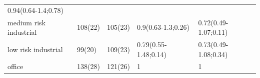 \begin{longtable}[]{@{}lllll@{}}
\begin{minipage}[t]{0.23\columnwidth}
0.94(0.64-1.4;0.78)\strut
\end{minipage}\tabularnewline
\begin{minipage}[t]{0.20\columnwidth}\raggedright
medium risk industrial\strut
\end{minipage} & \begin{minipage}[t]{0.08\columnwidth}\raggedright
108(22)\strut
\end{minipage} & \begin{minipage}[t]{0.10\columnwidth}\raggedright
105(23)\strut
\end{minipage} & \begin{minipage}[t]{0.24\columnwidth}\raggedright
0.9(0.63-1.3;0.26)\strut
\end{minipage} & \begin{minipage}[t]{0.23\columnwidth}\raggedright
0.72(0.49-1.07;0.11)\strut
\end{minipage}\tabularnewline
\begin{minipage}[t]{0.20\columnwidth}\raggedright
low risk industrial\strut
\end{minipage} & \begin{minipage}[t]{0.08\columnwidth}\raggedright
99(20)\strut
\end{minipage} & \begin{minipage}[t]{0.10\columnwidth}\raggedright
109(23)\strut
\end{minipage} & \begin{minipage}[t]{0.24\columnwidth}\raggedright
0.79(0.55-1.48;0.14)\strut
\end{minipage} & \begin{minipage}[t]{0.23\columnwidth}\raggedright
0.73(0.49-1.08;0.34)\strut
\end{minipage}\tabularnewline
\begin{minipage}[t]{0.20\columnwidth}\raggedright
office\strut
\end{minipage} & \begin{minipage}[t]{0.08\columnwidth}\raggedright
138(28)\strut
\end{minipage} & \begin{minipage}[t]{0.10\columnwidth}\raggedright
121(26)\strut
\end{minipage} & \begin{minipage}[t]{0.24\columnwidth}\raggedright
1\strut
\end{minipage} & \begin{minipage}[t]{0.23\columnwidth}\raggedright
1\strut
\end{minipage}\tabularnewline
\bottomrule
\end{longtable}


